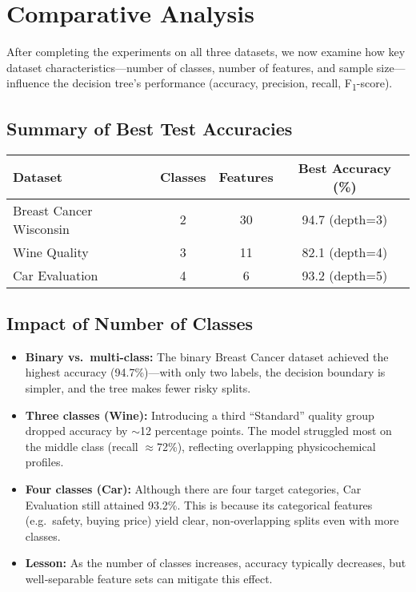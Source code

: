 \pagebreak
\section{Comparative Analysis}

After completing the experiments on all three datasets, we now examine how key dataset characteristics—number of classes, number of features, and sample size—influence the decision tree’s performance (accuracy, precision, recall, F\textsubscript{1}-score).

\subsection{Summary of Best Test Accuracies}
\begin{center}
	\begin{tabular}{|l|c|c|c|}
		\hline
		\textbf{Dataset}        & \textbf{Classes} & \textbf{Features} & \textbf{Best Accuracy (\%)} \\\hline
		Breast Cancer Wisconsin & 2                & 30                & 94.7 (depth=3)              \\\hline
		Wine Quality            & 3                & 11                & 82.1 (depth=4)              \\\hline
		Car Evaluation          & 4                & 6                 & 93.2 (depth=5)              \\\hline
	\end{tabular}
\end{center}

\subsection{Impact of Number of Classes}
\begin{itemize}
	\item \textbf{Binary vs.\ multi-class:} The binary Breast Cancer dataset achieved the highest accuracy (94.7\%)—with only two labels, the decision boundary is simpler, and the tree makes fewer risky splits.
	\item \textbf{Three classes (Wine):} Introducing a third “Standard” quality group dropped accuracy by $\sim$12 percentage points. The model struggled most on the middle class (recall $\approx$72\%), reflecting overlapping physicochemical profiles.
	\item \textbf{Four classes (Car):} Although there are four target categories, Car Evaluation still attained 93.2\%. This is because its categorical features (e.g.\ safety, buying price) yield clear, non‑overlapping splits even with more classes.
	\item \textbf{Lesson:} As the number of classes increases, accuracy typically decreases, but well‑separable feature sets can mitigate this effect.
\end{itemize}


